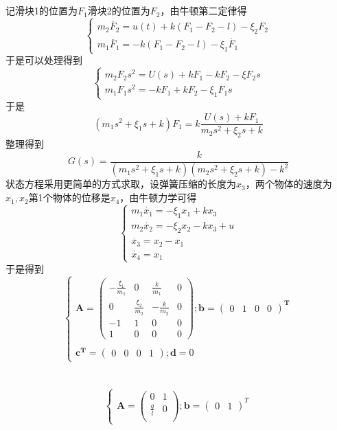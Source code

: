 \documentclass[UTF8,a4paper]{ctexart}
\begin{document}
\section{}
记滑块1的位置为$F_1$滑块2的位置为$F_2$，由牛顿第二定律得$$\begin{cases}
m_2\ddot{F_2}=u(t)+k(F_1-F_2-l)-\xi_2\dot{F_2} \\
m_1\ddot{F_1}=-k(F_1-F_2-l)-\xi_1\dot{F_1}
\end{cases}$$
于是可以处理得到$$\begin{cases}
m_2F_2s^2=U(s)+kF_1-kF_2-\xi F_2 s \\
m_1F_1s^2=-kF_1+kF_2-\xi_1 F_1s
\end{cases}$$
于是$$(m_1s^2+\xi_1s+k)F_1=k\frac{U(s)+kF_1}{m_2s^2+\xi_2s+k}$$
整理得到$$G(s)=\frac{k}{(m_1s^2+\xi_1s+k)(m_2s^2+\xi_2s+k)-k^2}$$
状态方程采用更简单的方式求取，设弹簧压缩的长度为$x_3$，两个物体的速度为$x_1,x_2$第1个物体的位移是$x_4$，由牛顿力学可得$$\begin{cases}
m_1\dot{x_1}=-\xi_1x_1+kx_3 \\
m_2\dot{x_2}=-\xi_2x_2-kx_3+u \\
\dot{x_3}=x_2-x_1 \\
\dot{x_4}=x_1  \end{cases}$$
于是得到$$\begin{cases}
\mathbf{A}=\begin{pmatrix}
-\frac{\xi_1}{m_1} & 0 & \frac{k}{m_1} & 0\\
0 & \frac{\xi_2}{m_2} & -\frac{k}{m_2} & 0\\
-1 & 1 & 0 & 0\\
1 & 0 & 0 & 0 \end{pmatrix} ;
\mathbf{b}=\begin{pmatrix} 0& 1& 0 & 0\end{pmatrix}^\mathbf{T} \\ \\ 
\mathbf{c^T}=\begin{pmatrix} 0& 0&0&1 \end{pmatrix} ;
\mathbf{d}=0\end{cases}$$
\section{}
$$\begin{cases}
\mathbf{A}=\begin{pmatrix} 0& 1\\ \frac{g}{l} & 0 \\ \end{pmatrix};
\mathbf{b}=\begin{pmatrix} 0& 1\end{pmatrix}^T\end{cases}$$
\end{document}
